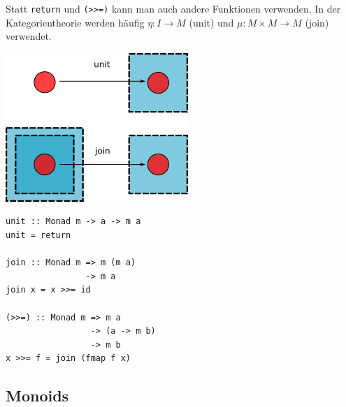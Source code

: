 \documentclass{beamer}
\begin{document}

\begin{frame}[fragile]

Statt \texttt{return} und \texttt{(>>=)} kann man auch andere Funktionen verwenden.
In der Kategorientheorie werden häufig $\eta : I \to M$ (unit) und $\mu : M \times M \to M$ (join) verwendet.
\pause

\begin{multicols}{2}

\begin{center}
\includegraphics[scale=0.4]{Unit-join.png} 
\end{center}

\columnbreak
\pause

\begin{verbatim}
unit :: Monad m -> a -> m a
unit = return

join :: Monad m => m (m a)
                -> m a
join x = x >>= id

(>>=) :: Monad m => m a
                 -> (a -> m b)
                 -> m b
x >>= f = join (fmap f x)
\end{verbatim}

\end{multicols}


\end{frame}

\subsection*{Monoids}
\end{document}
